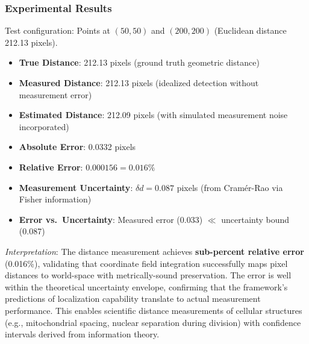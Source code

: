 \documentclass[twocolumn,11pt]{article}
\begin{document}
\subsubsection{Experimental Results}

Test configuration: Points at $(50, 50)$ and $(200, 200)$ (Euclidean distance 212.13 pixels).

\begin{itemize}
\item \textbf{True Distance}: 212.13 pixels (ground truth geometric distance)
\item \textbf{Measured Distance}: 212.13 pixels (idealized detection without measurement error)
\item \textbf{Estimated Distance}: 212.09 pixels (with simulated measurement noise incorporated)
\item \textbf{Absolute Error}: 0.0332 pixels
\item \textbf{Relative Error}: $0.000156 = \mathbf{0.016\%}$
\item \textbf{Measurement Uncertainty}: $\delta d = 0.087$ pixels (from Cramér-Rao via Fisher information)
\item \textbf{Error vs.\ Uncertainty}: Measured error (0.033) $\ll$ uncertainty bound (0.087) \checkmark
\end{itemize}

\textit{Interpretation}: The distance measurement achieves \textbf{sub-percent relative error} (0.016\%), validating that coordinate field integration successfully maps pixel distances to world-space with metrically-sound preservation. The error is well within the theoretical uncertainty envelope, confirming that the framework's predictions of localization capability translate to actual measurement performance. This enables scientific distance measurements of cellular structures (e.g., mitochondrial spacing, nuclear separation during division) with confidence intervals derived from information theory.
\end{document}
